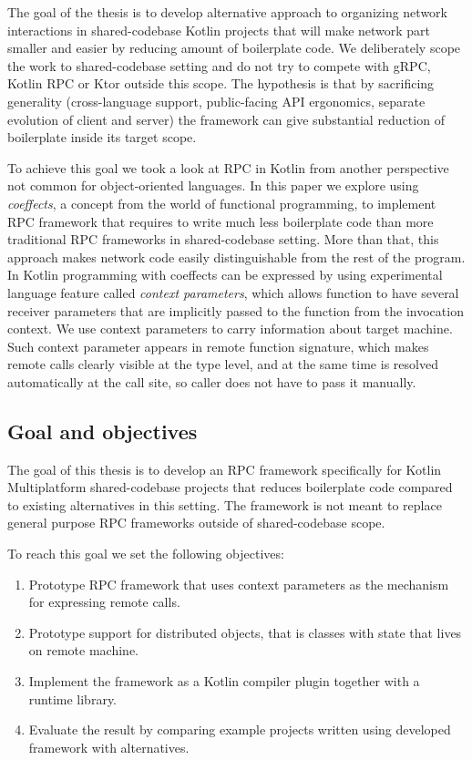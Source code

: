 \documentclass[a4paper,11pt,oneside]{article}
\newcommand{\term}[1]{\textit{#1}}
\begin{document}
The goal of the thesis is to develop alternative approach to organizing network interactions in
shared-codebase Kotlin projects that will make network part smaller and easier by reducing amount
of boilerplate code. We deliberately scope the work to shared-codebase setting and do not try to
compete with gRPC, Kotlin RPC or Ktor outside this scope. The hypothesis is that by sacrificing
generality (cross-language support, public-facing API ergonomics, separate evolution of client and
server) the framework can give substantial reduction of boilerplate inside its target scope.

To achieve this goal we took a look at RPC in Kotlin from another perspective not common for
object-oriented languages. In this paper we explore using \term{coeffects}, a concept from the
world of functional programming, to implement RPC framework that requires to write much less
boilerplate code than more traditional RPC frameworks in shared-codebase setting. More than that,
this approach makes network code easily distinguishable from the rest of the program. In Kotlin
programming with coeffects can be expressed by using experimental language feature called
\term{context parameters}, which allows function to have several receiver parameters that are
implicitly passed to the function from the invocation context. We use context parameters to carry
information about target machine. Such context parameter appears in remote function signature,
which makes remote calls clearly visible at the type level, and at the same time is resolved
automatically at the call site, so caller does not have to pass it manually.

\subsection{Goal and objectives} \label{goal_and_objectives_section}

The goal of this thesis is to develop an RPC framework specifically for Kotlin Multiplatform
shared-codebase projects that reduces boilerplate code compared to existing alternatives in this
setting. The framework is not meant to replace general purpose RPC frameworks outside of
shared-codebase scope.

To reach this goal we set the following objectives:
\begin{enumerate}
  \item Prototype RPC framework that uses context parameters as the mechanism for expressing
        remote calls.
  \item Prototype support for distributed objects, that is classes with state that lives on
        remote machine.
  \item Implement the framework as a Kotlin compiler plugin together with a runtime
        library.
  \item Evaluate the result by comparing example projects written using developed framework with 
        alternatives.
\end{enumerate}
\end{document}
